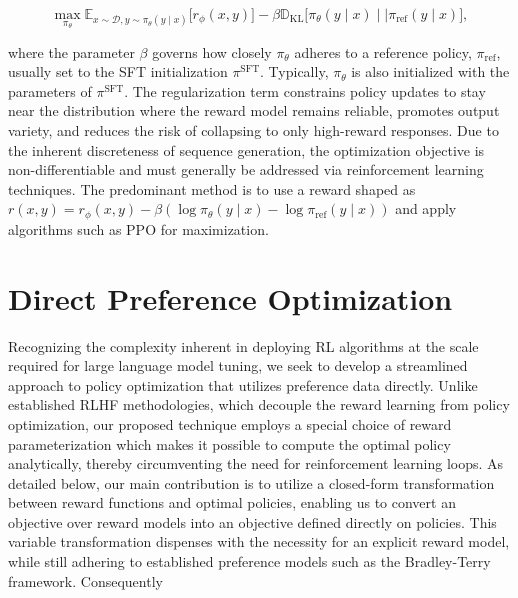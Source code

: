 \begin{equation}\label{eq:RL}
\max_{\pi_{\theta}}  \mathbb{E}_{x\sim \mathcal{D}, y\sim \pi_{\theta}(y \mid x)}\bigl[r_{\phi}(x, y)\bigr] - \beta\mathbb{D}_{\textrm{KL}}\bigl[\pi_{\theta}(y\mid x)\mid \mid \pi_\text{ref}(y\mid x)\bigr],
\end{equation}

where the parameter $\beta$ governs how closely $\pi_{\theta}$ adheres to a reference policy, $\pi_\text{ref}$, usually set to the SFT initialization $\pi^\text{SFT}$. Typically, $\pi_\theta$ is also initialized with the parameters of $\pi^\text{SFT}$. The regularization term constrains policy updates to stay near the distribution where the reward model remains reliable, promotes output variety, and reduces the risk of collapsing to only high-reward responses. Due to the inherent discreteness of sequence generation, the optimization objective is non-differentiable and must generally be addressed via reinforcement learning techniques. The predominant method \citep{ziegler2020finetuning, stiennon2022learning, bai2022training, ouyang2022training} is to use a reward shaped as ${r(x, y) = r_{\phi}(x, y) -\beta (\log \pi_{\theta}(y\mid x) - \log \pi_\text{ref}(y\mid x))}$ and apply algorithms such as PPO \cite{schulman2017proximal} for maximization.

\section{Direct Preference Optimization}\label{sec:DPO}

Recognizing the complexity inherent in deploying RL algorithms at the scale required for large language model tuning, we seek to develop a streamlined approach to policy optimization that utilizes preference data directly. Unlike established RLHF methodologies, which decouple the reward learning from policy optimization, our proposed technique employs a special choice of reward parameterization which makes it possible to compute the optimal policy analytically, thereby circumventing the need for reinforcement learning loops. As detailed below, our main contribution is to utilize a closed-form transformation between reward functions and optimal policies, enabling us to convert an objective over reward models into an objective defined directly on policies. This variable transformation dispenses with the necessity for an explicit reward model, while still adhering to established preference models such as the Bradley-Terry framework. Consequently

